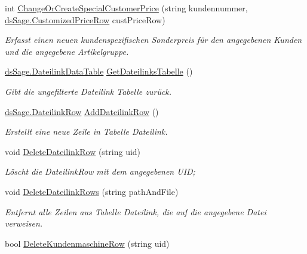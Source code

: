 \begin{DoxyCompactItemize}
\item 
int \hyperlink{class_products_1_1_data_1_1_data_service_a2188f0b0c334634c41d5e03b7744a072}{Change\+Or\+Create\+Special\+Customer\+Price} (string kundennummer, \hyperlink{class_products_1_1_data_1_1ds_sage_1_1_customized_price_row}{ds\+Sage.\+Customized\+Price\+Row} cust\+Price\+Row)
\begin{DoxyCompactList}\small\item\em Erfasst einen neuen kundenspezifischen Sonderpreis für den angegebenen Kunden und die angegebene Artikelgruppe. \end{DoxyCompactList}\item 
\hyperlink{class_products_1_1_data_1_1ds_sage_1_1_dateilink_data_table}{ds\+Sage.\+Dateilink\+Data\+Table} \hyperlink{class_products_1_1_data_1_1_data_service_a104d4c783ec16463276a1f7113fa2ebd}{Get\+Dateilinks\+Tabelle} ()
\begin{DoxyCompactList}\small\item\em Gibt die ungefilterte Dateilink Tabelle zurück. \end{DoxyCompactList}\item 
\hyperlink{class_products_1_1_data_1_1ds_sage_1_1_dateilink_row}{ds\+Sage.\+Dateilink\+Row} \hyperlink{class_products_1_1_data_1_1_data_service_a6d74c3c4a79e0d5df119661d88680dbb}{Add\+Dateilink\+Row} ()
\begin{DoxyCompactList}\small\item\em Erstellt eine neue Zeile in Tabelle Dateilink. \end{DoxyCompactList}\item 
void \hyperlink{class_products_1_1_data_1_1_data_service_a2869681c18f07194d4bbc2cdaae868a8}{Delete\+Dateilink\+Row} (string uid)
\begin{DoxyCompactList}\small\item\em Löscht die Dateilink\+Row mit dem angegebenen U\+ID; \end{DoxyCompactList}\item 
void \hyperlink{class_products_1_1_data_1_1_data_service_a2782253b4cd55ce5ea47aa52e7dd043f}{Delete\+Dateilink\+Rows} (string path\+And\+File)
\begin{DoxyCompactList}\small\item\em Entfernt alle Zeilen aus Tabelle Dateilink, die auf die angegebene Datei verweisen. \end{DoxyCompactList}\item 
bool \hyperlink{class_products_1_1_data_1_1_data_service_a587f568ad9da52077c72ed818b7fcc97}{Delete\+Kundenmaschine\+Row} (string uid)

\end{DoxyCompactItemize}
